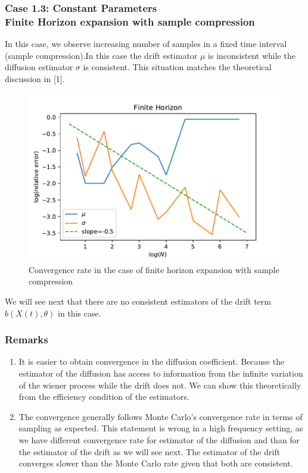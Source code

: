 \documentclass[aspectratio=169]{beamer}\usepackage[utf8]{inputenc}
\begin{document}
\begin{frame}\frametitle{ Case 1.3: Constant Parameters \\
 Finite Horizon expansion with sample compression }
In this case, we observe increasing number of  samples in a fixed time interval (sample compression).In this case the drift estimator $\mu$ is inconsistent while the diffusion estimator $\sigma$ is consistent. This situation  matches the theoretical discussion in [1].

\begin{figure}
  \includegraphics[scale=0.45]{Figures/case13v2.pdf}
  \caption{Convergence rate in the case of finite horizon expansion with sample compression  }
\end{figure}

We will see next that there are no consistent estimators of the drift  term $b(X(t), \theta)$ in this case. 

\end{frame}


\begin{frame}\frametitle{ Remarks }
\begin{enumerate}
\item  It is easier to obtain convergence in the diffusion coefficient. Because the estimator of the diffusion has access to  information from the infinite variation of the wiener process while the drift does not. We can show this theoretically from the efficiency condition of the estimators.
\item The convergence generally follows Monte Carlo's convergence rate in terms of sampling as expected. This statement is wrong in a high frequency setting, as we have different convergence rate for estimator of the diffusion and than for the estimator of the drift as we will see next. The estimator of the drift converges slower than the Monte Carlo rate given that both are consistent.
\end{enumerate}

\end{frame}
\end{document}
